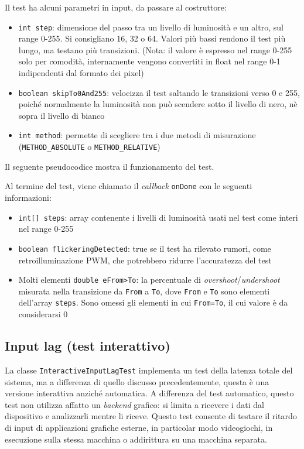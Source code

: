 Il test ha alcuni parametri in input, da passare al costruttore:\begin{itemize}
	\item \texttt{int step}: dimensione del passo tra un livello di luminosità e un altro, sul range 0-255. Si consigliano 16, 32 o 64. Valori più bassi rendono il test più lungo, ma testano più transizioni. (Nota: il valore è espresso nel range 0-255 solo per comodità, internamente vengono convertiti in float nel range 0-1 indipendenti dal formato dei pixel)
	\item \texttt{boolean skipTo0And255}: velocizza il test saltando le transizioni verso 0 e 255, poiché normalmente la luminosità non può scendere sotto il livello di nero, nè sopra il livello di bianco
	\item \texttt{int method}: permette di scegliere tra i due metodi di misurazione (\texttt{METHOD\_ABSOLUTE} o \texttt{METHOD\_RELATIVE})
\end{itemize}

Il seguente pseudocodice mostra il funzionamento del test.


Al termine del test, viene chiamato il \textit{callback} \texttt{onDone} con le seguenti informazioni:\begin{itemize}
	\item \texttt{int[] steps}: array contenente i livelli di luminosità usati nel test come interi nel range 0-255
	\item \texttt{boolean flickeringDetected}: true se il test ha rilevato rumori, come retroilluminazione PWM, che potrebbero ridurre l'accuratezza del test
	\item Molti elementi \texttt{double eFrom>To}: la percentuale di \textit{overshoot}/\textit{undershoot} misurata nella transizione da \texttt{From} a \texttt{To}, dove \texttt{From} e \texttt{To} sono elementi dell'array \texttt{steps}. Sono omessi gli elementi in cui \texttt{From=To}, il cui valore è da considerarsi 0
\end{itemize}

\subsection{Input lag (test interattivo)}
La classe \texttt{InteractiveInputLagTest} implementa un test della latenza totale del sistema, ma a differenza di quello discusso precedentemente, questa è una versione interattiva anziché automatica. A differenza del test automatico, questo test non utilizza affatto un \textit{backend} grafico: si limita a ricevere i dati dal dispositivo e analizzarli mentre li riceve. Questo test consente di testare il ritardo di input di applicazioni grafiche esterne, in particolar modo videogiochi, in esecuzione sulla stessa macchina o addirittura su una macchina separata.

